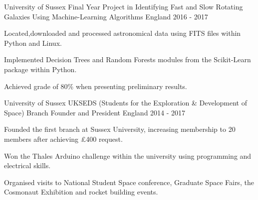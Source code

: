 \begin{cventries}
  \cventry
    {University of Sussex}
    {Final Year Project in Identifying Fast and Slow Rotating Galaxies Using Machine-Learning Algorithms}
    {England}
    {2016 - 2017}
    {
      \begin{cvitems}
        \item {Located,downloaded and processed astronomical data using FITS files within Python and Linux.}
        \item {Implemented Decision Trees and Random Forests modules from the Scikit-Learn package within Python.}
        \item {Achieved grade of 80\% when presenting preliminary results.}
      \end{cvitems}
    }
  \cventry
    {University of Sussex}
    {UKSEDS (Students for the Exploration \& Development of Space) Branch Founder and President}
    {England}
    {2014 - 2017}
    {
      \begin{cvitems}
        \item {Founded the first branch at Sussex University, increasing membership to 20 members after achieving £400 request.}
        \item {Won the Thales Arduino challenge within the university using programming and electrical skills.}
        \item {Organised visits to National Student Space conference, Graduate Space Fairs, the Cosmonaut Exhibition and rocket building events.}
      \end{cvitems}
    }
\end{cventries}
